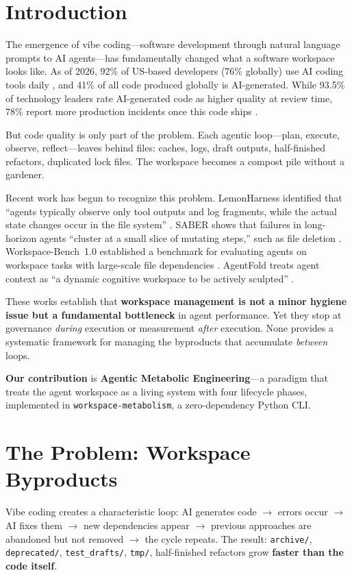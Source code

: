 \documentclass[sigconf]{acmart}
\begin{document}
\section{Introduction}
The emergence of vibe coding---software development through natural language prompts to AI agents---has fundamentally changed what a software workspace looks like. As of 2026, 92\% of US-based developers (76\% globally) use AI coding tools daily \cite{jetbrains2026}, and 41\% of all code produced globally is AI-generated. While 93.5\% of technology leaders rate AI-generated code as higher quality at review time, 78\% report more production incidents once this code ships \cite{newrelic2026}.

But code quality is only part of the problem. Each agentic loop---plan, execute, observe, reflect---leaves behind files: caches, logs, draft outputs, half-finished refactors, duplicated lock files. The workspace becomes a compost pile without a gardener.

Recent work has begun to recognize this problem. LemonHarness identified that ``agents typically observe only tool outputs and log fragments, while the actual state changes occur in the file system'' \cite{ren2026lemonharness}. SABER shows that failures in long-horizon agents ``cluster at a small slice of mutating steps,'' such as file deletion \cite{saber2025}. Workspace-Bench~1.0 established a benchmark for evaluating agents on workspace tasks with large-scale file dependencies \cite{tang2026workspacebench}. AgentFold treats agent context as ``a dynamic cognitive workspace to be actively sculpted'' \cite{tongyi2025agentfold}.

These works establish that \textbf{workspace management is not a minor hygiene issue but a fundamental bottleneck} in agent performance. Yet they stop at governance \emph{during} execution or measurement \emph{after} execution. None provides a systematic framework for managing the byproducts that accumulate \emph{between} loops.

\textbf{Our contribution} is \textbf{Agentic Metabolic Engineering}---a paradigm that treats the agent workspace as a living system with four lifecycle phases, implemented in \texttt{workspace-metabolism}, a zero-dependency Python CLI.

\section{The Problem: Workspace Byproducts}
Vibe coding creates a characteristic loop: AI generates code $\rightarrow$ errors occur $\rightarrow$ AI fixes them $\rightarrow$ new dependencies appear $\rightarrow$ previous approaches are abandoned but not removed $\rightarrow$ the cycle repeats. The result: \texttt{archive/}, \texttt{deprecated/}, \texttt{test\_drafts/}, \texttt{tmp/}, half-finished refactors grow \textbf{faster than the code itself}.
\end{document}
